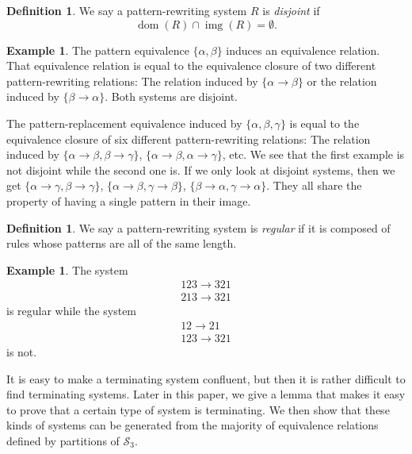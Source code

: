 \documentclass[a4paper, 11pt, english]{article}
\newcommand{\patternrule}{ \to \!}
\theoremstyle{definition}
\newtheorem{definition}[theorem]{Definition}
\newtheorem{example}[theorem]{Example}
\newcommand{\Sym}{\mathcal{S}}
\DeclareMathOperator{\dom}{dom}
\DeclareMathOperator{\img}{img}
\begin{document}
\begin{definition}
  We say a pattern-rewriting system $R$ is \emph{disjoint} if 
  \[
    \dom(R) \cap \img(R) = \emptyset.
  \]
\end{definition}

\begin{example}
  The pattern equivalence $\{ \alpha, \beta \}$ induces an equivalence relation.
  That equivalence relation is equal to the equivalence closure of two different pattern-rewriting
  relations: The relation induced by $\{ \alpha \patternrule \beta \}$ or the relation induced by
  $\{ \beta \patternrule \alpha \}$. Both systems are disjoint.

  The pattern-replacement equivalence induced by $\{ \alpha, \beta, \gamma \}$ is
  equal to the equivalence closure of six different pattern-rewriting
  relations: The relation induced by $\{ \alpha \patternrule \beta, \beta \patternrule \gamma \}$,
  $\{ \alpha \patternrule \beta, \alpha \patternrule \gamma \}$, etc. We see that the first example is
  not disjoint while the second one is. If we only look at disjoint systems, then we get
  $\{ \alpha \patternrule \gamma, \beta \patternrule \gamma \}$,
  $\{ \alpha \patternrule \beta, \gamma \patternrule \beta \}$,
  $\{ \beta \patternrule \alpha, \gamma \patternrule \alpha \}$.
  They all share the property of having a single pattern in their image.
\end{example}

\begin{definition}
  We say a pattern-rewriting system is \emph{regular} if it is composed of rules whose patterns are all
  of the same length.
\end{definition}

\begin{example}
  The system
  \begin{gather*}
    123 \patternrule 321 \\
    213 \patternrule 321
  \end{gather*}
  is regular while the system
  \begin{gather*}
    12 \patternrule 21 \\
    123 \patternrule 321 
  \end{gather*}
  is not.
\end{example}

It is easy to make a terminating system confluent, but then it is rather difficult to find
terminating systems. Later in this paper, we give a lemma that makes it easy to prove that a certain
type of system is terminating. We then show that these kinds of systems can be generated from the
majority of equivalence relations defined by partitions of $\Sym_3$.
\end{document}
